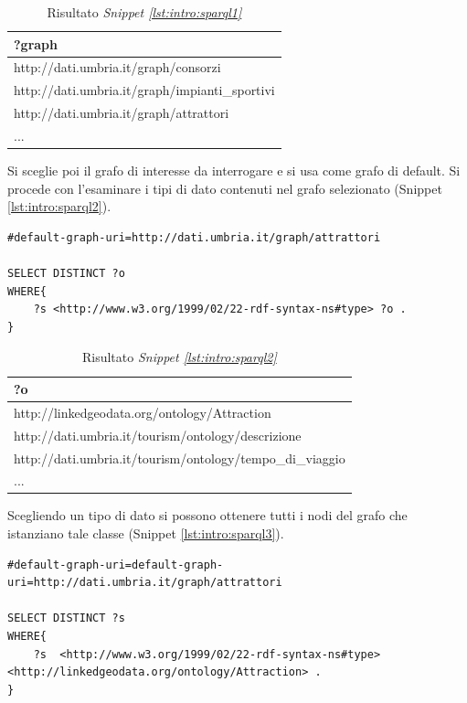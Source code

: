 \begin{table}[htbp]
\begin{center}
\begin{tabular}{|l|}
\hline \textbf{?graph} \\
\hline
http://dati.umbria.it/graph/consorzi\\
\hline
http://dati.umbria.it/graph/impianti\_sportivi\\
\hline
http://dati.umbria.it/graph/attrattori\\
\hline
...\\
\hline
\end{tabular}
\end{center}
\caption{Risultato \textit{Snippet \ref{lst:intro:sparql1}}}
\label{tab:intro:sparql1}
\end{table}

Si sceglie poi il grafo di interesse da interrogare e si usa come grafo di default. Si procede con l'esaminare i tipi di dato contenuti nel grafo selezionato (Snippet \ref{lst:intro:sparql2}).


\begin{lstlisting}[frame=single, caption={Individuare i tipi di dato del grafo scelto.},label={lst:intro:sparql2}]  
#default-graph-uri=http://dati.umbria.it/graph/attrattori

SELECT DISTINCT ?o
WHERE{
	?s <http://www.w3.org/1999/02/22-rdf-syntax-ns#type> ?o .
}
\end{lstlisting}

\begin{table}[htbp]
\begin{center}
\begin{tabular}{|l|}
\hline \textbf{?o} \\
\hline
http://linkedgeodata.org/ontology/Attraction\\
\hline
http://dati.umbria.it/tourism/ontology/descrizione\\
\hline
http://dati.umbria.it/tourism/ontology/tempo\_di\_viaggio\\
\hline
...\\
\hline
\end{tabular}
\end{center}
\caption{Risultato \textit{Snippet \ref{lst:intro:sparql2}}}
\label{tab:intro:sparql2}
\end{table}

Scegliendo un tipo di dato si possono ottenere tutti i nodi del grafo che istanziano tale classe (Snippet \ref{lst:intro:sparql3}).
\begin{lstlisting}[frame=single, caption={Individuare i nodi del tipo scelto.},label={lst:intro:sparql3}]  
#default-graph-uri=default-graph-uri=http://dati.umbria.it/graph/attrattori

SELECT DISTINCT ?s 
WHERE{
    ?s  <http://www.w3.org/1999/02/22-rdf-syntax-ns#type> <http://linkedgeodata.org/ontology/Attraction> .
}
\end{lstlisting}

